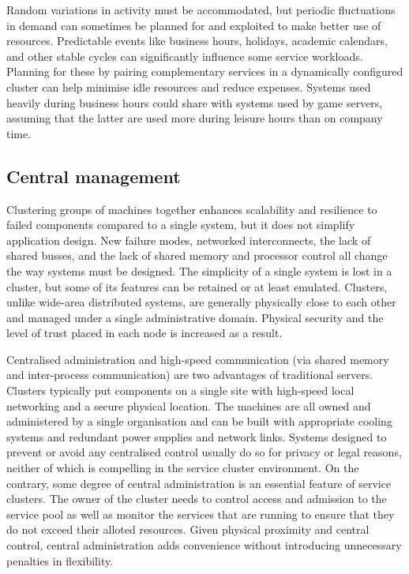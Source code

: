 Random variations in activity must be accommodated, but periodic fluctuations in demand can sometimes be planned for and exploited to make better use of resources. Predictable events like business hours, holidays, academic calendars, and other stable cycles can significantly influence some service workloads. Planning for these by pairing complementary services in a dynamically configured cluster can help minimise idle resources and reduce expenses. Systems used heavily during business hours could share with systems used by game servers, assuming that the latter are used more during leisure hours than on company time.

\subsection{Central management}

Clustering groups of machines together enhances scalability and resilience to failed components compared to a single system, but it does not simplify application design. New failure modes, networked interconnects, the lack of shared busses, and the lack of shared memory and processor control all change the way systems must be designed. The simplicity of a single system is lost in a cluster, but some of its features can be retained or at least emulated. Clusters, unlike wide-area distributed systems, are generally physically close to each other and managed under a single administrative domain. Physical security and the level of trust placed in each node is increased as a result.

Centralised administration and high-speed communication (via shared memory and inter-process communication) are two advantages of traditional servers. Clusters typically put components on a single site with high-speed local networking and a secure physical location. The machines are all owned and administered by a single organisation and can be built with appropriate cooling systems and redundant power supplies and network links. Systems designed to prevent or avoid any centralised control usually do so for privacy or legal reasons, neither of which is compelling in the service cluster environment. On the contrary, some degree of central administration is an essential feature of service clusters. The owner of the cluster needs to control access and admission to the service pool as well as monitor the services that are running to ensure that they do not exceed their alloted resources. Given physical proximity and central control, central administration adds convenience without introducing unnecessary penalties in flexibility.

